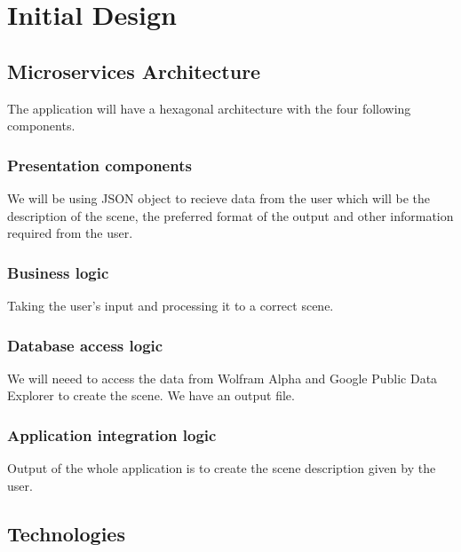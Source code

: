 \documentclass[a4paper,12pt]{article}
\begin{document}
%
%




\section{Initial Design}  %

\subsection{Microservices Architecture}
The application will have a hexagonal architecture with the four following components.
\subsubsection{Presentation components}
We will be using JSON object to recieve data from the user which will be the description of the scene, the preferred format of the output and other information required from the user. 

\subsubsection{Business logic}
Taking the user's input and processing it to a correct scene.

\subsubsection{Database access logic}
We will neeed to access the data from Wolfram Alpha and Google Public Data Explorer to create the scene. We have an output file. 

\subsubsection{Application integration logic}
Output of the whole application is to create the scene description given by the user.


\subsection{Technologies}
\end{document}

